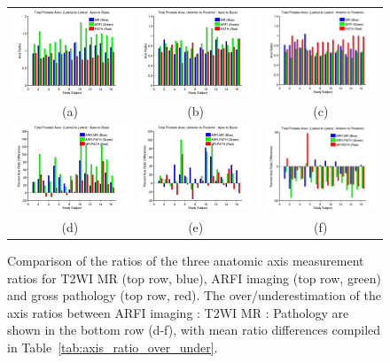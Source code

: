 \begin{figure}[htb!]
\centering
\begin{tabular}{ccc}
\includegraphics[width=0.3\linewidth]{figs/mr_arfi_total_axes1} &
\includegraphics[width=0.3\linewidth]{figs/mr_arfi_total_axes2} &
\includegraphics[width=0.3\linewidth]{figs/mr_arfi_total_axes3} \\
(a) & (b) & (c) \\
\includegraphics[width=0.3\linewidth]{figs/mr_arfi_total_over_under1} &
\includegraphics[width=0.3\linewidth]{figs/mr_arfi_total_over_under2} &
\includegraphics[width=0.3\linewidth]{figs/mr_arfi_total_over_under3} \\
(d) & (e) & (f) \\
\end{tabular}
\caption{Comparison of the ratios of the three anatomic axis measurement ratios
    for T2WI MR (top row, blue), ARFI imaging (top row, green) and gross
    pathology (top row, red).  The over/underestimation of the axis ratios
    between ARFI imaging : T2WI MR : Pathology are shown in the bottom row
    (d-f), with mean ratio differences compiled in
    Table~\ref{tab:axis_ratio_over_under}.}
\label{fig:mr_arfi_total_axes} 
\end{figure}
